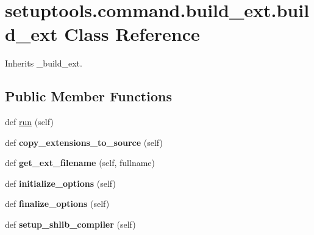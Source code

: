 \hypertarget{classsetuptools_1_1command_1_1build__ext_1_1build__ext}{}\section{setuptools.\+command.\+build\+\_\+ext.\+build\+\_\+ext Class Reference}
\label{classsetuptools_1_1command_1_1build__ext_1_1build__ext}


Inherits \+\_\+build\+\_\+ext.

\subsection*{Public Member Functions}
\begin{DoxyCompactItemize}
\item 
def \hyperlink{classsetuptools_1_1command_1_1build__ext_1_1build__ext_a0372d0eabace81aa2e90696daadc6d53}{run} (self)
\item 
\mbox{\label{classsetuptools_1_1command_1_1build__ext_1_1build__ext_a48d3a798a1f80e22af46ea54bf353780}} 
def {\bfseries copy\+\_\+extensions\+\_\+to\+\_\+source} (self)
\item 
\mbox{\label{classsetuptools_1_1command_1_1build__ext_1_1build__ext_aa70c67c690d0bf9105529fccd60418a4}} 
def {\bfseries get\+\_\+ext\+\_\+filename} (self, fullname)
\item 
\mbox{\label{classsetuptools_1_1command_1_1build__ext_1_1build__ext_a6376896e22a6d2a234af6cb1df5c637f}} 
def {\bfseries initialize\+\_\+options} (self)
\item 
\mbox{\label{classsetuptools_1_1command_1_1build__ext_1_1build__ext_a00c5288297268466cb1e33b460d8ca6c}} 
def {\bfseries finalize\+\_\+options} (self)
\item 
\mbox{\label{classsetuptools_1_1command_1_1build__ext_1_1build__ext_a41d4833a23e6f467d4067a06d6babe38}} 
def {\bfseries setup\+\_\+shlib\+\_\+compiler} (self)
\item 

\end{DoxyCompactItemize}
